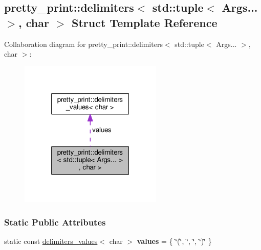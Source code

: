 \hypertarget{structpretty__print_1_1delimiters_3_01std_1_1tuple_3_01Args_8_8_8_01_4_00_01char_01_4}{}\subsection{pretty\+\_\+print\+:\+:delimiters$<$ std\+:\+:tuple$<$ Args... $>$, char $>$ Struct Template Reference}
\label{structpretty__print_1_1delimiters_3_01std_1_1tuple_3_01Args_8_8_8_01_4_00_01char_01_4}


Collaboration diagram for pretty\+\_\+print\+:\+:delimiters$<$ std\+:\+:tuple$<$ Args... $>$, char $>$\+:
\nopagebreak
\begin{figure}[H]
\begin{center}
\leavevmode
\includegraphics[width=193pt]{structpretty__print_1_1delimiters_3_01std_1_1tuple_3_01Args_8_8_8_01_4_00_01char_01_4__coll__graph}
\end{center}
\end{figure}
\subsubsection*{Static Public Attributes}
\begin{DoxyCompactItemize}
\item 
static const \hyperlink{structpretty__print_1_1delimiters__values}{delimiters\+\_\+values}$<$ char $>$ {\bfseries values} = \{ \char`\"{}(\char`\"{}, \char`\"{}, \char`\"{}, \char`\"{})\char`\"{} \}\hypertarget{structpretty__print_1_1delimiters_3_01std_1_1tuple_3_01Args_8_8_8_01_4_00_01char_01_4_a6a3918ef5b9547beb7187460bc5d7180}{}\label{structpretty__print_1_1delimiters_3_01std_1_1tuple_3_01Args_8_8_8_01_4_00_01char_01_4_a6a3918ef5b9547beb7187460bc5d7180}

\end{DoxyCompactItemize}


